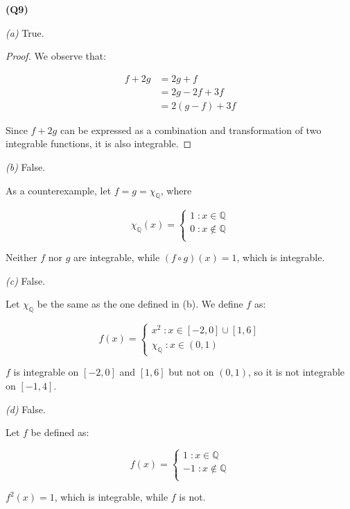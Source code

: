 \documentclass[12pt, a4paper]{article}
\newcommand{\Q}{\mathbb{Q}}
\begin{document}
\textbf{(Q9)}

\textit{(a)} True.

\begin{proof}
    We observe that:

    \begin{align*}
        f + 2g & = 2g + f\\
        & = 2g - 2f + 3f\\
        & = 2(g - f) + 3f
    \end{align*}

    Since $f + 2g$ can be expressed as a combination and transformation
    of two integrable functions, it is also integrable.
\end{proof}

\textit{(b)} False.

As a counterexample, let $f = g = \chi_{\Q}$, where

\[
    \chi_{\Q}(x) = \begin{cases}
        1 \; \colon x \in \Q\\
        0 \; \colon x \notin \Q\\
    \end{cases}
\]

Neither $f$ nor $g$ are integrable, while $(f \circ g) (x) = 1$, which is integrable.

\textit{(c)} False.

Let $\chi_{\Q}$ be the same as the one defined in (b). We define $f$ as:

\[
    f(x) = \begin{cases}
        x^2 \; \colon x \in [-2 ,0] \cup [1, 6]\\
        \chi_{\Q} \; \colon x \in (0, 1)
    \end{cases}
\]

$f$ is integrable on $[-2, 0]$ and $[1, 6]$ but not on $(0, 1)$, so it is not
integrable on $[-1, 4]$.

\textit{(d)} False.

Let $f$ be defined as:

\[
    f(x) = \begin{cases}
        1 \; \colon x \in \Q\\
        -1 \; \colon x \notin \Q\\
    \end{cases}
\]

$f^2(x) = 1$, which is integrable, while $f$ is not.
\end{document}
